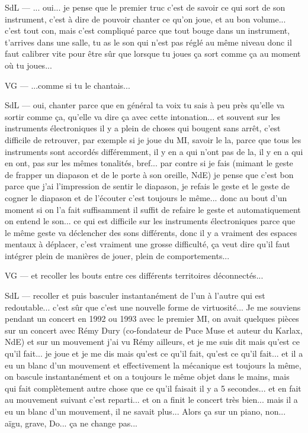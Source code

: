 SdL — ... oui... je pense que le premier truc c'est de savoir ce qui sort de son instrument, c'est à dire de pouvoir chanter ce qu'on joue, et au bon volume... c'est tout con, mais c'est compliqué parce que tout bouge dans un instrument, t'arrives dans une salle, tu as le son qui n'est pas réglé au même niveau donc il faut calibrer vite pour être sûr que lorsque tu joues ça sort comme ça au moment où tu joues... 

VG — ...comme si tu le chantais... 

SdL — oui, chanter parce que en général ta voix tu sais à peu près qu'elle va sortir comme ça, qu'elle va dire ça avec cette intonation... et souvent sur les instruments électroniques il y a plein de choses qui bougent sans arrêt, c'est difficile de retrouver, par exemple si je joue du MI, savoir le la, parce que tous les instruments sont accordés différemment, il y en a qui n'ont pas de la, il y en a qui en ont, pas sur les mêmes tonalités, bref... par contre si je fais (mimant le geste de frapper un diapason et de le porte à son oreille, NdE) je pense que c'est bon parce que j'ai l'impression de sentir le diapason, je refais le geste et le geste de cogner le diapason et de l'écouter c'est toujours le même... donc au bout d'un moment si on l'a fait suffisamment il suffit de refaire le geste et automatiquement on entend le son... ce qui est difficile sur les instruments électroniques parce que le même geste va déclencher des sons différents, donc il y a vraiment des espaces mentaux à déplacer, c'est vraiment une grosse difficulté, ça veut dire qu'il faut intégrer plein de manières de jouer, plein de comportements... 

VG — et recoller les bouts entre ces différents territoires déconnectés... 

SdL — recoller et puis basculer instantanément de l'un à l'autre qui est redoutable... c'est sûr que c'est une nouvelle forme de virtuosité... Je me souviens pendant un concert en 1992 ou 1993 avec le premier MI, on avait quelques pièces sur un concert avec Rémy Dury (co-fondateur de Puce Muse et auteur du Karlax, NdE) et sur un mouvement j'ai vu Rémy ailleurs, et je me suis dit mais qu'est ce qu'il fait... je joue et je me dis mais qu'est ce qu'il fait, qu'est ce qu'il fait... et il a eu un blanc d'un mouvement et effectivement la mécanique est toujours la même, on bascule instantanément et on a toujours le même objet dans le mains, mais qui fait complètement autre chose que ce qu'il faisait il y a 5 secondes... et en fait au mouvement suivant c'est reparti... et on a finit le concert très bien... mais il a eu un blanc d'un mouvement, il ne savait plus... Alors ça sur un piano, non... aïgu, grave, Do... ça ne change pas... 

